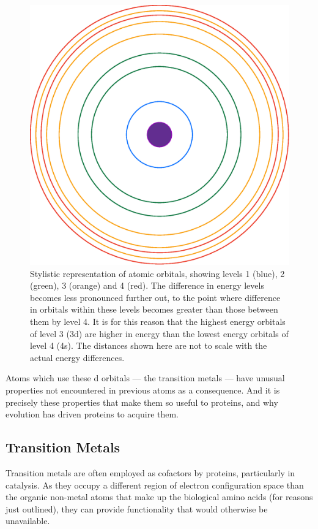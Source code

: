 \begin{figure}
\centering
\includegraphics[width=1.0\textwidth]{Figures/orbitals.eps}
\caption[Stylistic representation of atomic orbitals]{\label{fig:orbitals} Stylistic representation of atomic orbitals, showing levels 1 (blue), 2 (green), 3 (orange) and 4 (red). The difference in energy levels becomes less pronounced further out, to the point where difference in orbitals within these levels becomes greater than those between them by level 4. It is for this reason that the highest energy orbitals of level 3 (3d) are higher in energy than the lowest energy orbitals of level 4 (4s). The distances shown here are not to scale with the actual energy differences.}
\end{figure}

Atoms which use these d orbitals --- the transition metals --- have unusual properties not encountered in previous atoms as a consequence. And it is precisely these properties that make them so useful to proteins, and why evolution has driven proteins to acquire them.

\subsection{Transition Metals}

Transition metals are often employed as cofactors by proteins, particularly in catalysis. As they occupy a different region of electron configuration space than the organic non-metal atoms that make up the biological amino acids (for reasons just outlined), they can provide functionality that would otherwise be unavailable.

